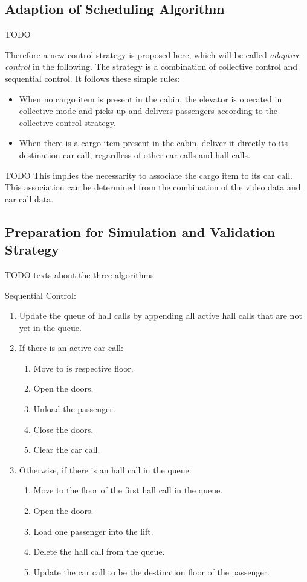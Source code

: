 \subsection{Adaption of Scheduling Algorithm}




TODO

Therefore a new control strategy is proposed here, which will be called \emph{adaptive control} in the following. 
The strategy is a combination of collective control and sequential control.
It follows these simple rules:

\begin{itemize}
    \item When no cargo item is present in the cabin, the elevator is operated in collective mode and picks up and delivers passengers according to the collective control strategy.
    \item When there is a cargo item present in the cabin, deliver it directly to its destination car call, regardless of other car calls and hall calls.
\end{itemize}

TODO
This implies the necessarity to associate the cargo item to its car call. 
This association can be determined from the combination of the video data and car call data.

\subsection{Preparation for Simulation and Validation Strategy}

TODO texts about the three algorithms

Sequential Control:
\begin{enumerate}[noitemsep]
    \item Update the queue of hall calls by appending all active hall calls that are not yet in the queue.
    \item If there is an active car call:
    \begin{enumerate}[noitemsep]
        \item Move to is respective floor.
        \item Open the doors.
        \item Unload the passenger. 
        \item Close the doors. 
        \item Clear the car call.
    \end{enumerate}
    \item Otherwise, if there is an hall call in the queue:
    \begin{enumerate}[noitemsep]
        \item Move to the floor of the first hall call in the queue. 
        \item Open the doors.
        \item Load one passenger into the lift. 
        \item Delete the hall call from the queue.
        \item Update the car call to be the destination floor of the passenger.
    \end{enumerate}
\end{enumerate}

